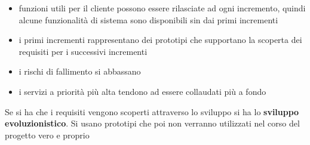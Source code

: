 \documentclass[a4paper,12pt, oneside]{book}
\begin{document}
\begin{itemize}
\item funzioni utili per il cliente possono essere rilasciate ad ogni incremento, quindi alcune funzionalità di sistema sono disponibili sin dai primi incrementi
\item i primi incrementi rappresentano dei prototipi che supportano la scoperta dei requisiti per i successivi incrementi
\item i rischi di fallimento si abbassano
\item i servizi a priorità più alta tendono ad essere collaudati più a fondo
\end{itemize}
Se si ha che i requisiti vengono scoperti attraverso lo sviluppo si ha lo \textbf{sviluppo evoluzionistico}. Si usano prototipi che poi non verranno utilizzati nel corso del progetto vero e proprio
\end{document}
